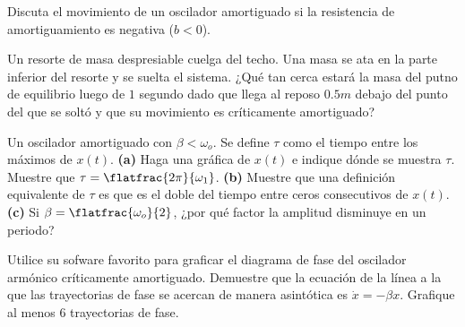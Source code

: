 \begin{mdframed}[style=warning]
	\begin{ejercicio}
		Discuta el movimiento de un oscilador amortiguado si la resistencia de amortiguamiento es negativa ($b < 0$).
	\end{ejercicio}
\end{mdframed}




\begin{mdframed}[style=warning]
	\begin{ejercicio}
		Un resorte de masa despresiable cuelga del techo. Una masa se ata en la parte inferior del resorte y se suelta el sistema. ¿Qué tan cerca estará la masa del putno de equilibrio luego de $1$ segundo dado que llega al reposo $0.5m$ debajo del punto del que se soltó y que su movimiento es críticamente amortiguado?
	\end{ejercicio}
\end{mdframed}




\begin{mdframed}[style=warning]
	\begin{ejercicio}
		Un oscilador amortiguado con $\beta < \omega _o$. Se define $\tau$ como el tiempo entre los máximos de $x(t)$. \textbf{(a)} Haga una gráfica de $x(t)$ e indique dónde se muestra $\tau$. Muestre que $\tau = \flatfrac{2\pi}{\omega _1}$. \textbf{(b)} Muestre que una definición equivalente de $\tau$ es que es el doble del tiempo entre ceros consecutivos de $x(t)$. \textbf{(c)} Si $\beta = \flatfrac{\omega _o}{2}$, ¿por qué factor la amplitud disminuye en un periodo?
	\end{ejercicio}
\end{mdframed}





\begin{mdframed}[style=warning]
	\begin{ejercicio}
		Utilice su sofware favorito para graficar el diagrama de fase del oscilador armónico críticamente amortiguado. Demuestre que la ecuación de la línea a la que las trayectorias de fase se acercan de manera asintótica es $\dot{x} = -\beta x$. Grafique al menos $6$ trayectorias de fase.
	\end{ejercicio}
\end{mdframed}





